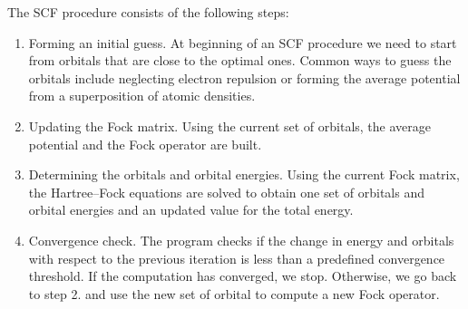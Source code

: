 \documentclass[../Main/chem371-notes.tex]{subfiles}
\begin{document}
The SCF procedure consists of the following steps:
\begin{enumerate}
\item Forming an initial guess. At beginning of an SCF procedure we need to start from orbitals that are close to the optimal ones.
Common ways to guess the orbitals include neglecting electron repulsion or forming the average potential from a superposition of atomic densities.
\item Updating the Fock matrix. Using the current set of orbitals, the average potential and the Fock operator are built. 
\item Determining the orbitals and orbital energies. Using the current Fock matrix, the Hartree--Fock equations are solved to obtain one set of orbitals and orbital energies and an updated value for the total energy.
\item Convergence check. The program checks if the change in energy and orbitals with respect to the previous iteration is less than a predefined convergence threshold. If the computation has converged, we stop. Otherwise, we go back to step 2. and use the new set of orbital to compute a new Fock operator.
\end{enumerate}
\end{document}
